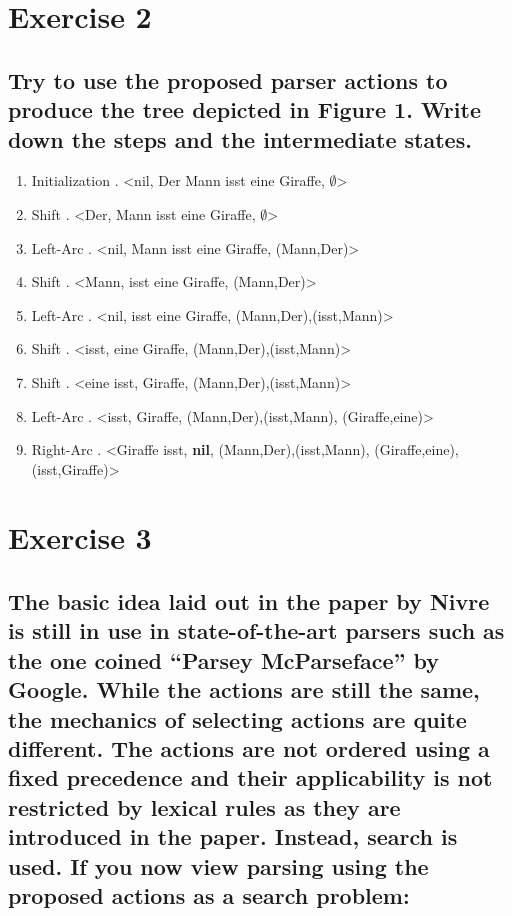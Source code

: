 \documentclass[paper=a4, fontsize=11pt]{scrartcl} %
\numberwithin{equation}{section} %
\numberwithin{figure}{section} %
\numberwithin{table}{section} %
\begin{document}
\section*{Exercise 2}


\subsection*{Try to use the proposed parser actions to produce the tree depicted in Figure 1. Write down the steps and the intermediate states.}

\begin{enumerate}
	\item Initialization . <nil, Der Mann isst eine Giraffe, $\emptyset$>
	\item Shift . <Der, Mann isst eine Giraffe, $\emptyset$>
	\item Left-Arc . <nil, Mann isst eine Giraffe, {(Mann,Der)}>
	\item Shift . <Mann, isst eine Giraffe, {(Mann,Der)}>
	\item Left-Arc . <nil, isst eine Giraffe, {(Mann,Der),(isst,Mann)}>
	\item Shift . <isst, eine Giraffe, {(Mann,Der),(isst,Mann)}>
	\item Shift . <eine isst, Giraffe, {(Mann,Der),(isst,Mann)}>
	\item Left-Arc . <isst, Giraffe, {(Mann,Der),(isst,Mann), (Giraffe,eine)}>
	\item Right-Arc . <Giraffe isst, \textbf{nil}, {(Mann,Der),(isst,Mann), (Giraffe,eine), (isst,Giraffe)}>
	
\end{enumerate}





\section*{Exercise 3}

\subsection*{The basic idea laid out in the paper by Nivre is still in use in state-of-the-art parsers such as the one coined “Parsey McParseface” by Google. While the actions are still the same, the mechanics of selecting actions are quite different. The actions are not ordered using a fixed precedence and their applicability is not restricted by lexical rules as they are introduced in the paper. Instead, search is used. If you now view parsing using the proposed actions as a search problem:}
\end{document}
